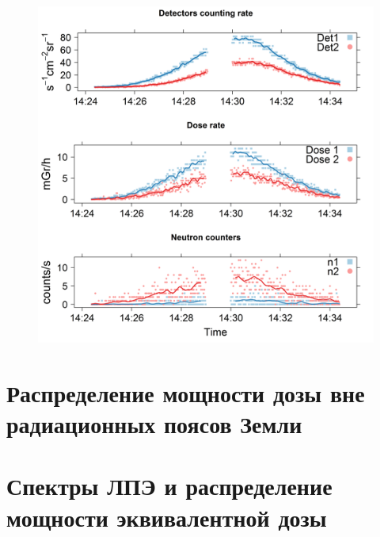 \begin{figure}
	\centering
	\includegraphics[width=0.7\linewidth]{images/results/depron_sec_log_new08-29-1614-24-23}
	\caption{}
	\label{fig:depronseclognew08-29-1614-24-23}
\end{figure}

\section{Распределение мощности дозы вне радиационных поясов Земли}

\section{Спектры ЛПЭ и распределение мощности эквивалентной дозы}